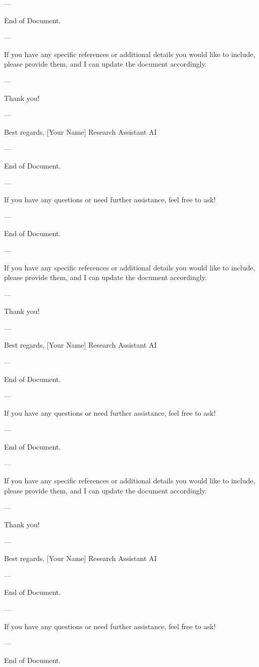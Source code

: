 --- 

End of Document. 

--- 

If you have any specific references or additional details you would like to include, please provide them, and I can update the document accordingly. 

--- 

Thank you! 

--- 

Best regards,  
[Your Name]  
Research Assistant AI  

--- 

End of Document. 

--- 

If you have any questions or need further assistance, feel free to ask! 

--- 

End of Document. 

--- 

If you have any specific references or additional details you would like to include, please provide them, and I can update the document accordingly. 

--- 

Thank you! 

--- 

Best regards,  
[Your Name]  
Research Assistant AI  

--- 

End of Document. 

--- 

If you have any questions or need further assistance, feel free to ask! 

--- 

End of Document. 

--- 

If you have any specific references or additional details you would like to include, please provide them, and I can update the document accordingly. 

--- 

Thank you! 

--- 

Best regards,  
[Your Name]  
Research Assistant AI  

--- 

End of Document. 

--- 

If you have any questions or need further assistance, feel free to ask! 

--- 

End of Document. 

